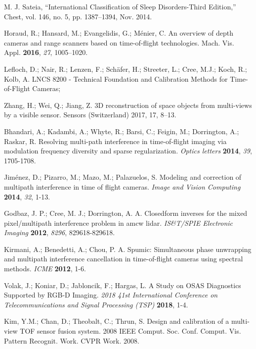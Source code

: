 \begin{thebibliography}{9}

M. J. Sateia, “International Classification of Sleep Disorders-Third Edition,” Chest, vol. 146, no. 5, pp. 1387–1394, Nov. 2014. 
	

Horaud, R.; Hansard, M.; Evangelidis, G.; Ménier, C. An overview of depth cameras and range scanners based on time-of-flight technologies. Mach. Vis. Appl. {\bf 2016}, {\em 27}, 1005–1020.

Lefloch, D.; Nair, R.; Lenzen, F.; Schäfer, H.; Streeter, L.; Cree, M.J.; Koch, R.; Kolb, A. LNCS 8200 - Technical Foundation and Calibration Methods for Time-of-Flight Cameras;

Zhang, H.; Wei, Q.; Jiang, Z. 3D reconstruction of space objects from multi-views by a visible sensor. Sensors (Switzerland) 2017, 17, 8–13.

Bhandari, A.; Kadambi, A.; Whyte, R.; Barsi, C.; Feigin, M.; Dorrington, A.; Raskar, R. Resolving multi-path interference in time-of-flight imaging via modulation frequency diversity and sparse regularization. {\em Optics letters} {\bf 2014}, {\em 39}, 1705-1708.

Jiménez, D.; Pizarro, M.; Mazo, M.; Palazuelos, S. Modeling and correction of multipath interference in time of flight cameras. {\em Image and Vision Computing} {\bf 2014}, {\em 32}, 1-13.

Godbaz, J. P.; Cree, M. J.; Dorrington, A. A. Closedform inverses for the mixed pixel/multipath interference problem in amcw lidar. {\em IS\&T/SPIE Electronic Imaging} {\bf 2012}, {\em 8296}, 829618-829618.

Kirmani, A.; Benedetti, A.; Chou, P. A. Spumic: Simultaneous phase unwrapping and multipath interference cancellation in time-of-flight cameras using spectral methods. {\em ICME} {\bf 2012}, 1-6.

Volak, J.; Koniar, D.; Jabloncik, F.; Hargas, L. A Study on OSAS Diagnostics Supported by RGB-D Imaging. {\em 2018 41st International Conference on Telecommunications and Signal Processing (TSP)} {\bf 2018}, 1-4.

Kim, Y.M.; Chan, D.; Theobalt, C.; Thrun, S. Design and calibration of a multi-view TOF sensor fusion system. 2008 IEEE Comput. Soc. Conf. Comput. Vis. Pattern Recognit. Work. CVPR Work. 2008.


\end{thebibliography}
